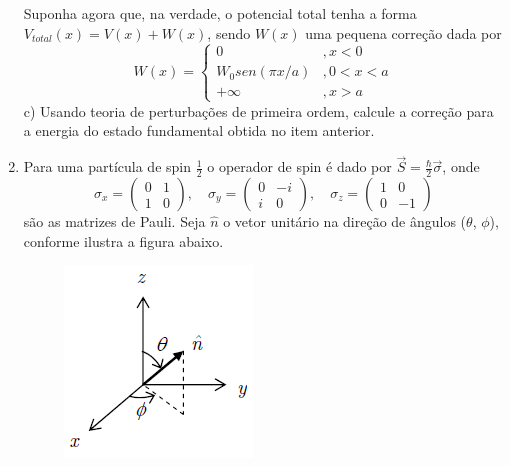 \begin{enumerate}[start=1,label={\bfseries Q\arabic*.}]
Suponha agora que, na verdade, o potencial total tenha a forma $V_{total}(x) =V(x) +W(x)$, sendo $W(x)$ uma pequena correção dada por
$$
W(x)=\left\{\begin{array}{cc}
0 & , x<0 \\
W_{0} sen (\pi x /a) & , 0<x<a \\
+\infty & , x>a
\end{array}\right.
$$
c) Usando teoria de perturbações de primeira ordem, calcule a correção para a energia do estado fundamental obtida no item anterior.




\item Para uma partícula de spin $\frac{1}{2}$ o operador de spin é dado por $\vec{S} = \frac{\hbar}{2} \vec{\sigma} $, onde
$$
\sigma_{x}=\left(\begin{array}{ll}
0 & 1 \\
1 & 0
\end{array}\right), \quad \sigma_{y}=\left(\begin{array}{cc}
0 & -i \\
i & 0
\end{array}\right), \quad \sigma_{z}=\left(\begin{array}{cc}
1 & 0 \\
0 & -1
\end{array}\right)
$$
são as matrizes de Pauli. Seja $\hat{n}$ o vetor unitário na direção de ângulos ($\theta$, $\phi$), conforme ilustra a figura abaixo.
\begin{figure}
  \centering
  \includegraphics[scale=0.8]{quantica-img/vetor.png}
\end{figure}




\end{enumerate}
